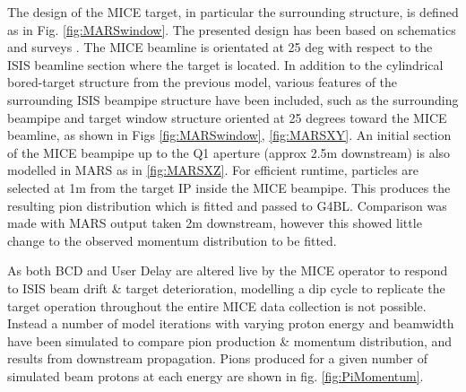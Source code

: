 \documentclass[a4paper,11pt]{article}
\begin{document}
The design of the MICE target, in particular the surrounding structure, is defined as in Fig. \ref{fig:MARSwindow}. The presented design has been based on schematics \cite{beampipesurvey1}\cite{beampipesurvey2}\cite{beampipesurvey3} and surveys \cite{ISISbeamlinesurvey}\cite{MICEsurvey}. The MICE beamline is orientated at 25 deg with respect to the ISIS beamline section where the target is located. In addition to the cylindrical bored-target structure from the previous model, various features of the surrounding ISIS beampipe structure have been included, such as the surrounding beampipe and target window structure oriented at 25 degrees toward the MICE beamline, as shown in Figs \ref{fig:MARSwindow}, \ref{fig:MARSXY}. An initial section of the MICE beampipe up to the Q1 aperture (approx 2.5m downstream) is also modelled in MARS as in \ref{fig:MARSXZ}. For efficient runtime, particles are selected at 1m from the target IP inside the MICE beampipe. This produces the resulting pion distribution which is fitted and passed to G4BL. Comparison was made with MARS output taken 2m downstream, however this showed little change to the observed momentum distribution to be fitted.

As both BCD and User Delay are altered live by the MICE operator to respond to ISIS beam drift \& target deterioration, modelling a dip cycle to replicate the target operation throughout the entire MICE data collection is not possible. Instead a number of model iterations with varying proton energy and beamwidth have been simulated to compare pion production \& momentum distribution, and results from downstream propagation. Pions produced for a given number of simulated beam protons at each energy are shown in fig. \ref{fig:PiMomentum}. 
\end{document}
